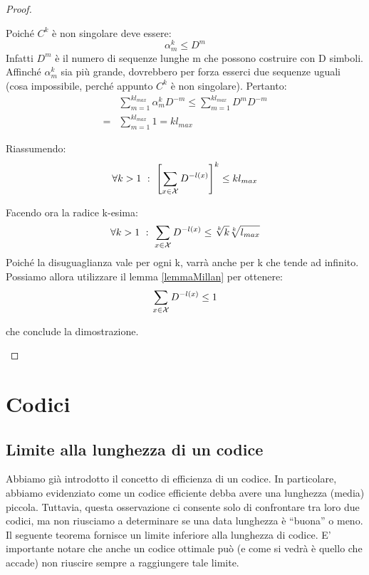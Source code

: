 \begin{teorema}
\begin{proof}
\begin{description}
Poiché $C^k$ è non singolare deve essere:
\[\alpha_m^k \leq D^m\] 
Infatti $D^m$ è il numero di sequenze lunghe m che possono costruire con D simboli. Affinché $\alpha_m^k$ sia più grande, 
dovrebbero per forza esserci due sequenze uguali (cosa impossibile, perché appunto $C^k$ è non singolare).
Pertanto:
\[\begin{split}
 & \sum_{m=1}^{k l_{max}} {\alpha}_m^k D^{-m} 
 \le \sum_{m=1}^{k l_{max}} D^m D^{-m} \\
 =&\sum_{m=1}^{k l_{max}} 1 
 =k l_{max}
  \end{split}
\]

Riassumendo:
\[
 \forall k>1 \ : \ \left[ \sum_{x \in \mathcal{X}} D^{-l(x)} \right]^k \le k l_{max}
\]

Facendo ora la radice k-esima:
\[
\forall k>1 \ : \ \sum_{x \in \mathcal{X}} D^{-l(x)} \le \sqrt[k]{k} \sqrt[k]{l_{max}}
\]
Poiché la disuguaglianza vale per ogni k, varrà anche per k che tende ad infinito.
Possiamo allora utilizzare il lemma \ref{lemmaMillan} per ottenere:
\[
 \sum_{x \in \mathcal{X}} D^{-l(x)} \le 1
\]

che conclude la dimostrazione.

\end{description}
\end{proof}
\end{teorema}


\section{Codici}
\subsection{Limite alla lunghezza di un codice}
Abbiamo già introdotto il concetto di efficienza di un codice. In particolare, abbiamo evidenziato come un codice efficiente debba 
avere una lunghezza (media) piccola. Tuttavia, questa osservazione ci consente solo di confrontare tra loro due codici, ma non riusciamo 
a determinare se una data lunghezza è ``buona'' o meno.
Il seguente teorema fornisce un limite inferiore alla lunghezza di codice. E' importante notare che anche un codice ottimale può 
(e come si vedrà è quello che accade) non riuscire sempre a raggiungere tale limite.

